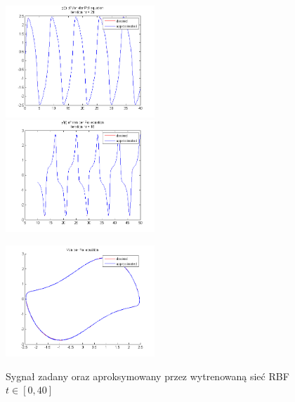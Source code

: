 \begin{figure}[ht!]
	\centering

	\subfloat
	{\includegraphics[width=0.5\textwidth]
	{images/signal_approx.png}}
	\subfloat
	{\includegraphics[width=0.5\textwidth]
	{images/deriv_approx.png}}	
	
	\subfloat
	{\includegraphics[width=0.5\textwidth]
	{images/trajectory_approx.png}}

	\caption{Sygnał zadany oraz aproksymowany przez wytrenowaną sieć RBF $t \in [0,40]$}
	\label{img:approximated}
\end{figure}


